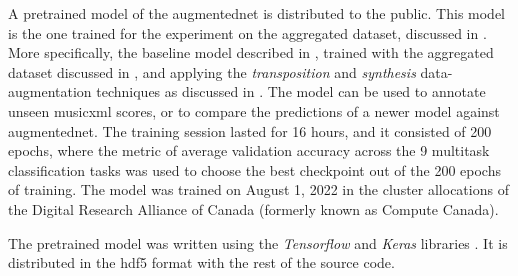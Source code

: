 
A pretrained model of the \gls{augmentednet} is distributed
to the public. This model is the one trained for the
experiment on the aggregated dataset, discussed in
. More specifically,
the baseline model described in ,
trained with the aggregated dataset discussed in
, and applying the
\emph{transposition} and \emph{synthesis} data-augmentation
techniques as discussed in
. The model can be used
to annotate unseen \gls{musicxml} scores, or to compare the
predictions of a newer model against \gls{augmentednet}. The
training session lasted for 16 hours, and it consisted of
200 epochs, where the metric of average validation accuracy
across the 9 multitask classification tasks was used to
choose the best checkpoint out of the 200 epochs of
training. The model was trained on August 1, 2022 in the
cluster allocations of the Digital Research Alliance of
Canada (formerly known as Compute Canada).

The pretrained model was written using the \emph{Tensorflow}
and \emph{Keras} libraries \parencite{abadi2016tensorflow,
chollet2021deep}. It is distributed in the \gls{hdf5} format
with the rest of the source
code. 
